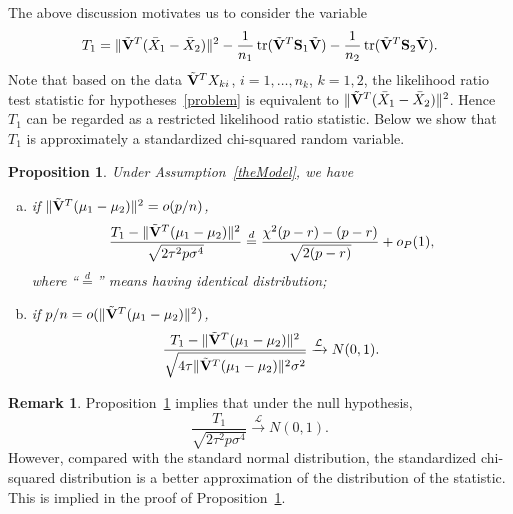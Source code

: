 \documentclass[3p]{elsarticle}
\DeclareMathOperator{\mytr}{tr}
\theoremstyle{plain}
\newtheorem{proposition}{\quad\quad Proposition}
\theoremstyle{definition}
\newtheorem{remark}{\quad\quad Remark}
\theoremstyle{remark}
\begin{document}
The above discussion motivates us to consider the variable
\begin{equation*}
\begin{aligned}
    T_1=\|\tilde{\BV}^T(\bar{X}_1-\bar{X}_2)\|^2-\frac{1}{n_1}\mytr(\tilde{\BV}^T \BS_1\tilde{\BV})-\frac{1}{n_2}\mytr(\tilde{\BV}^T \BS_2\tilde{\BV}).
    \\
\end{aligned}
\end{equation*}
 Note that based on the data $\tilde{\mathbf{V}}^T X_{ki}$, $i=1,\ldots,n_k$, $k=1,2$, the likelihood ratio test statistic for hypotheses~\eqref{problem} is equivalent to 
    $\|\tilde{\mathbf{V}}^T (\bar{X}_1-\bar{X}_2)\|^2$. 
Hence $T_1$ can be regarded as a restricted likelihood ratio statistic.
Below we show that $T_1$ is approximately a standardized chi-squared random variable.
\begin{proposition}\label{oracleTheorem}
    Under Assumption~\ref{theModel}, we have 
    \begin{enumerate}[(a)]
\item
    if $\|\tilde{\mathbf{V}}^T(\mu_1-\mu_2)\|^2= o(p/n)$,
    \begin{equation}\label{oracleTheoremR1}
        \frac{T_1-\|\tilde{\BV}^T(\mu_1-\mu_2)\|^2}
        {\sqrt{2\tau^2 p\sigma^4}}%
        \overset{d}{=} \frac{\chi^2(p-r)-(p-r)}{\sqrt{2(p-r)}}+o_P(1),
    \end{equation}
where ``$\overset{d}{=}$'' means having identical distribution;
\item
    if $p/n= o(\|\tilde{\mathbf{V}}^T(\mu_1-\mu_2)\|^2)$, 
    \begin{equation}\label{oracleTheoremR2}
        \frac{T_1-\|\tilde{\mathbf{V}}^T(\mu_1-\mu_2)\|^2}
        {\sqrt{4\tau\|\tilde{\mathbf{V}}^T(\mu_1-\mu_2)\|^2\sigma^2}}\xrightarrow{\mathcal{L}}N(0,1).
    \end{equation}
    \end{enumerate}
\end{proposition}
\begin{remark}
    Proposition~\ref{oracleTheorem} implies that under the null hypothesis,
    $$
        \frac{T_1}
        {\sqrt{2\tau^2 p\sigma^4}}\xrightarrow{\mathcal{L}}N(0,1).
    $$
    However, compared with the standard normal distribution, the standardized chi-squared distribution is a better approximation of the distribution of the statistic.
    This is implied in the proof of Proposition~\ref{oracleTheorem}.
\end{remark}
\end{document}
